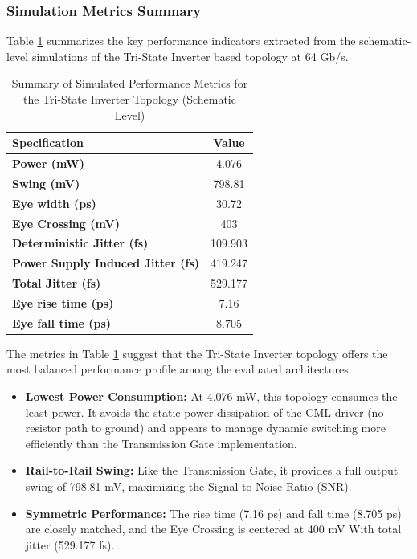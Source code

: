 \documentclass[12pt, a4paper]{report}
\begin{document}
\subsubsection{Simulation Metrics Summary}
\label{subsubsec:tinv_sim_metrics}

Table \ref{tab:tinv_metrics} summarizes the key performance indicators extracted from the schematic-level simulations of the Tri-State Inverter based topology at 64 Gb/s.

\begin{table}[H]
    \centering
    \caption{Summary of Simulated Performance Metrics for the Tri-State Inverter Topology (Schematic Level)}
    \label{tab:tinv_metrics}
    \renewcommand{\arraystretch}{1.4}
    \setlength{\tabcolsep}{12pt}
    \begin{tabular}{|l|c|}
        \hline
        \textbf{Specification} & \textbf{Value} \\ \hline
        \textbf{Power (mW)} & 4.076 \\ \hline
        \textbf{Swing (mV)} & 798.81 \\ \hline
        \textbf{Eye width (ps)} & 30.72 \\ \hline
        \textbf{Eye Crossing (mV)} & 403 \\ \hline
        \textbf{Deterministic Jitter (fs)} & 109.903 \\ \hline
        \textbf{Power Supply Induced Jitter (fs)} & 419.247 \\ \hline
        \textbf{Total Jitter (fs)} & 529.177 \\ \hline
        \textbf{Eye rise time (ps)} & 7.16 \\ \hline
        \textbf{Eye fall time (ps)} & 8.705 \\ \hline
    \end{tabular}
\end{table}

The metrics in Table \ref{tab:tinv_metrics} suggest that the Tri-State Inverter topology offers the most balanced performance profile among the evaluated architectures:

\begin{itemize}
    \item \textbf{Lowest Power Consumption:} At 4.076 mW, this topology consumes the least power. It avoids the static power dissipation of the CML driver (no resistor path to ground) and appears to manage dynamic switching more efficiently than the Transmission Gate implementation.
    
    \item \textbf{Rail-to-Rail Swing:} Like the Transmission Gate, it provides a full output swing of 798.81 mV, maximizing the Signal-to-Noise Ratio (SNR).
    
    \item \textbf{Symmetric Performance:} The rise time (7.16 ps) and fall time (8.705 ps) are closely matched, and the Eye Crossing is centered at 400 mV With total jitter (529.177 fs).
    
\end{itemize}
\end{document}
